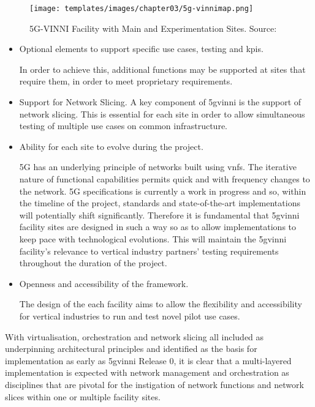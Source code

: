 \begin{figure}[!ht]
    \centering
    \texttt{[image: templates/images/chapter03/5g-vinnimap.png]}
    \caption{5G-VINNI Facility with Main and Experimentation Sites. Source: \cite{5gvinni-site-map}}
    \label{fig:5g-vinnimap}
\end{figure}

\newpage
\begin{itemize}
    \item     Optional elements to support specific use cases, testing and \acrshort{kpi}s. 
    
    In order to achieve this, additional functions may be supported at sites that require them, in order to meet proprietary requirements.
    
    \item     Support for Network Slicing. 
    A key component of \acrshort{5gvinni} is the support of network slicing. This is essential for each site in order to allow simultaneous testing of multiple use cases on common infrastructure.
    
    \item     Ability for each site to evolve during the project. 
    
    5G has an underlying principle of networks built using \acrshort{vnf}s. The iterative nature of functional capabilities permits quick and with frequency changes to the network. 5G specifications is currently a work in progress and so, within the timeline of the project, standards and state-of-the-art implementations will potentially shift significantly. Therefore it is fundamental that \acrshort{5gvinni} facility sites are designed in such a way so as to allow implementations to keep pace with technological evolutions. This will maintain the \acrshort{5gvinni} facility's relevance to vertical industry partners' testing requirements throughout the duration of the project.
    
    \item     Openness and accessibility of the framework. 
    
    The design of the each facility aims to allow the flexibility and accessibility for vertical industries to run and test novel pilot use cases.
\end{itemize}
With virtualisation, orchestration and network slicing all included as underpinning architectural principles and identified as the basis for implementation as early as \acrshort{5gvinni} Release 0, it is clear that a multi-layered implementation is expected with network management and orchestration as disciplines that are pivotal for the instigation of network functions and network slices within one or multiple facility sites.

